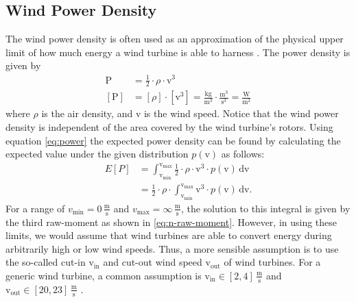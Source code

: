 \documentclass{article}
\theoremstyle{plain}
\theoremstyle{definition}
\theoremstyle{remark}
\begin{document}
\subsection{Wind Power Density}\label{sec:power-density}

The wind power density is often used as an approximation of the physical upper limit of how much
energy a wind turbine is able to harness \cite{wang2021wind, mohammadi2016assessing,
miao2020117382}. The power density is given by
\begin{align}\label{eq:power}
    \mathrm{P} &= \frac{1}{2} \cdot \rho \cdot \mathrm{v}^3 \\
    [\mathrm{P}] &= [\rho] \cdot [\mathrm{v}^3] = \frac{\mathrm{kg}}{\mathrm{m}^3} \cdot \frac{\mathrm{m}^3}{\mathrm{s}^3} = \frac{\mathrm{W}}{\mathrm{m}^2}
\end{align}
where $\rho$ is the air density, and $\mathrm{v}$ is the wind speed. Notice that the wind power
density is independent of the area covered by the wind turbine's rotors. Using equation
\eqref{eq:power} the expected power density can be found by calculating the expected value under the
given distribution $p(\mathrm{v})$ as follows:
\begin{align}\label{eq:power-expectation}
    E[P] &= \int_{\mathrm{v}_\mathrm{min}}^{\mathrm{v}_\mathrm{max}} \frac{1}{2} \cdot \rho \cdot \mathrm{v}^3 \cdot p(\mathrm{v}) \, \mathrm{dv} \\
    &= \frac{1}{2} \cdot \rho \cdot \int_{\mathrm{v}_\mathrm{min}}^{\mathrm{v}_\mathrm{max}} \mathrm{v}^3 \cdot p(\mathrm{v}) \, \mathrm{dv}.
\end{align}
For a range of $v_\mathrm{min} = 0 \, \frac{\mathrm{m}}{\mathrm{s}}$ and $v_\mathrm{max} = \infty \,
\frac{\mathrm{m}}{\mathrm{s}}$, the solution to this integral is given by the third raw-moment as
shown in \eqref{eq:n-raw-moment}. However, in using these limits, we would assume that wind turbines
are able to convert energy during arbitrarily high or low wind speeds. Thus, a more sensible
assumption is to use the so-called cut-in $\mathrm{v}_\mathrm{in}$ and cut-out wind speed
$\mathrm{v}_\mathrm{out}$ of wind turbines. For a generic wind turbine, a common assumption is
$\mathrm{v}_\mathrm{in} \in [2, 4] \, \frac{\mathrm{m}}{\mathrm{s}}$ and $\mathrm{v}_\mathrm{out}
\in [20, 23] \, \frac{\mathrm{m}}{\mathrm{s}}$ \cite{dupont2017, wang2021wind}.
\end{document}
